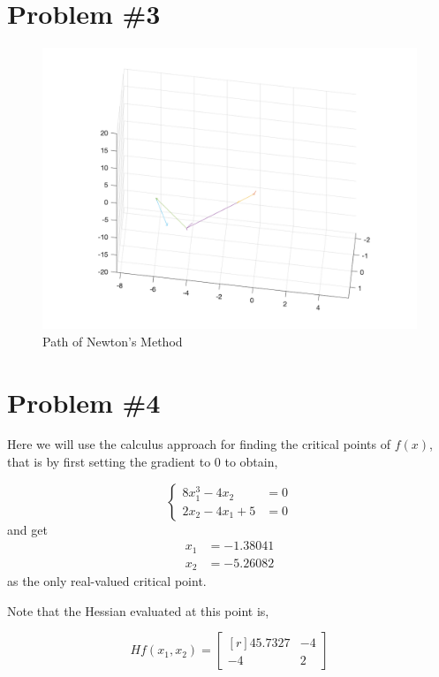 \documentclass{article}
\begin{document}
\section*{Problem \#3}
\begin{figure}[H]
    \centering
    \includegraphics[scale=0.3]{fig1.png}
    \caption{Path of Newton's Method}
    \label{fig:my_label}
\end{figure}
\section*{Problem \#4}
Here we will use the calculus approach for finding the critical points of $f(x)$, that is by first setting the gradient to $0$ to obtain,

\begin{equation*}
    \begin{cases}
        8x_1^3-4x_2 &= 0 \\
        2x_2-4x_1 + 5 &= 0
    \end{cases}
\end{equation*}
and get
\begin{align*}
    x_1 &= -1.38041 \\
    x_2 &= -5.26082
\end{align*}
as the only real-valued critical point. 

Note that the Hessian evaluated at this point is,

\begin{equation*}
    Hf(x_1,x_2) = \begin{bmatrix*}[r]45.7327 & -4 \\ -4 & 2\end{bmatrix*}
\end{equation*}
\end{document}
